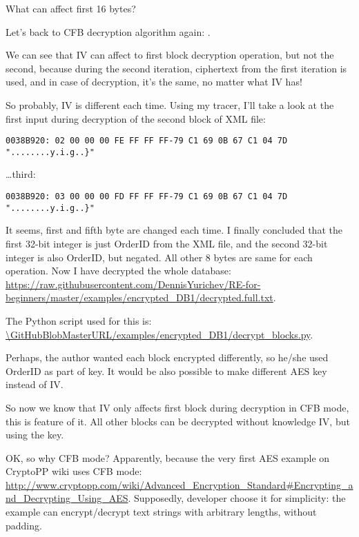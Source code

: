 What can affect first 16 bytes?

Let's back to \ac{CFB} decryption algorithm again: .

We can see that \ac{IV} can affect to first block decryption operation, but not the second,
because during the second iteration, ciphertext from the first iteration is used, and in case of decryption,
it's the same, no matter what \ac{IV} has!

So probably, \ac{IV} is different each time.
Using my tracer, I'll take a look at the first input during decryption of the second block
of \ac{XML} file:

\begin{lstlisting}
0038B920: 02 00 00 00 FE FF FF FF-79 C1 69 0B 67 C1 04 7D "........y.i.g..}"
\end{lstlisting}

\dots third:

\begin{lstlisting}
0038B920: 03 00 00 00 FD FF FF FF-79 C1 69 0B 67 C1 04 7D "........y.i.g..}"
\end{lstlisting}

It seems, first and fifth byte are changed each time.
I finally concluded that the first 32-bit integer is just OrderID from the \ac{XML} file,
and the second 32-bit integer is also OrderID, but negated. All other 8 bytes are same for each operation.
Now I have decrypted the whole database:
\url{https://raw.githubusercontent.com/DennisYurichev/RE-for-beginners/master/examples/encrypted_DB1/decrypted.full.txt}.

The Python script used for this is:
\url{\GitHubBlobMasterURL/examples/encrypted_DB1/decrypt_blocks.py}.

Perhaps, the author wanted each block encrypted differently, so he/she used OrderID as part of key.
It would be also possible to make different AES key instead of \ac{IV}.

So now we know that \ac{IV} only affects first block during decryption in \ac{CFB} mode, this is
feature of it.
All other blocks can be decrypted without knowledge \ac{IV}, but using the key.

OK, so why \ac{CFB} mode? Apparently, because the very first AES example on CryptoPP wiki
uses \ac{CFB} mode:
\url{http://www.cryptopp.com/wiki/Advanced_Encryption_Standard#Encrypting_and_Decrypting_Using_AES}.
Supposedly, developer choose it for simplicity:
the example can encrypt/decrypt text strings with arbitrary lengths, without padding.

